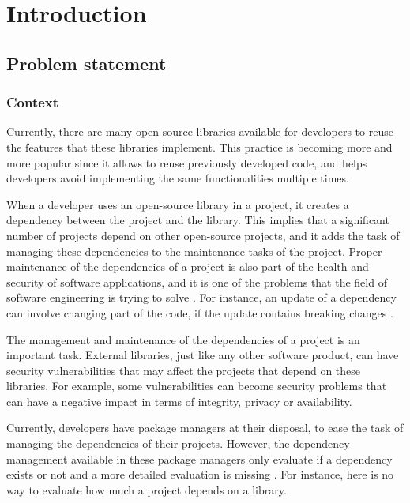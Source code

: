 \chapter{Introduction}\label{ch:Introduction}

\section{Problem statement}

\subsection{Context}
Currently, there are many open-source libraries available for developers to reuse the features that these libraries implement. This practice is becoming more and more popular since it allows to reuse previously developed code, and helps developers avoid implementing the same functionalities multiple times.

When a developer uses an open-source library in a project, it creates a dependency between the project and the library. This implies that a significant number of projects depend on other open-source projects, and it adds the task of managing these dependencies to the maintenance tasks of the project.  Proper maintenance of the dependencies of a project is also part of the health and security of software applications, and it is one of the problems that the field of software engineering is trying to solve \cite{kula2014visualizing}. For instance, an update of a dependency can involve changing part of the code, if the update contains breaking changes \cite{Raemaekers2017}.

The management and maintenance of the dependencies of a project is an important task. External libraries, just like any other software product, can have security vulnerabilities that may affect the projects that depend on these libraries. For example, some vulnerabilities can become security problems that can have a negative impact in terms of integrity, privacy or availability.

\blankl
Currently, developers have package managers at their disposal, to ease the task of managing the dependencies of their projects. However, the dependency management available in these package managers only evaluate if a dependency exists or not and a more detailed evaluation is missing \cite{hejderup2018prazi}. For instance, here is no way to evaluate how much a project depends on a library.

